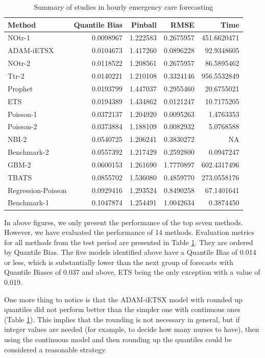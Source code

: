 \documentclass[]{elsarticle} %
\begin{document}
\begin{table}[!h]

\caption{\label{tab:tab-results}Summary of studies in hourly emergency care forecasting}
\centering
\fontsize{9}{11}\selectfont
\begin{tabular}[t]{lrrrr}
\toprule
Method & Quantile Bias & Pinball & RMSE & Time\\
\midrule
NOtr-1 & 0.0098967 & 1.222583 & 0.2675957 & 451.6620471\\
ADAM-iETSX & 0.0104673 & 1.417260 & 0.0896228 & 92.9348605\\
NOtr-2 & 0.0118522 & 1.208561 & 0.2675957 & 86.5895462\\
Ttr-2 & 0.0140221 & 1.210108 & 0.3324146 & 956.5532849\\
Prophet & 0.0193799 & 1.447037 & 0.2955460 & 20.6755021\\
ETS & 0.0194389 & 1.434862 & 0.0121247 & 10.7175205\\
Poisson-1 & 0.0372137 & 1.204920 & 0.0095263 & 1.4763353\\
Poisson-2 & 0.0373884 & 1.188109 & 0.0082932 & 5.0768588\\
NBI-2 & 0.0540725 & 1.206241 & 0.3830272 & NA\\
Benchmark-2 & 0.0557392 & 1.217429 & 0.2592800 & 0.0947247\\
GBM-2 & 0.0600153 & 1.261690 & 1.7770897 & 602.4317496\\
TBATS & 0.0855702 & 1.536080 & 0.4859770 & 273.0558176\\
Regression-Poisson & 0.0929416 & 1.293524 & 0.8490258 & 67.1401641\\
Benchmark-1 & 0.1047874 & 1.254491 & 1.0042634 & 0.3874450\\
\bottomrule
\end{tabular}
\end{table}

In above figures, we only present the performance of the top seven methods. However, we have evaluated the performance of 14 methods. Evaluation metrics for all methods from the test period are presented in Table \ref{tab:tab-results}. They are ordered by Quantile Bias. The five models identified above have a Quantile Bias of 0.014 or less, which is substantially lower than the next group of forecasts with Quantile Biases of 0.037 and above, ETS being the only exception with a value of 0.019.

One more thing to notice is that the ADAM-iETSX model with rounded up quantiles did not perform better than the simpler one with continuous ones (Table \ref{tab:tab-results}). This implies that the rounding is not necessary in general, but if integer values are needed (for example, to decide how many nurses to have), then using the continuous model and then rounding up the quantiles could be considered a reasonable strategy.
\end{document}
